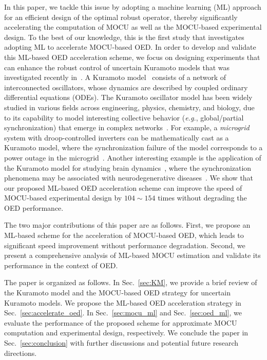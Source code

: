 \documentclass{article}
\begin{document}
In this paper, we tackle this issue by adopting a machine learning (ML) approach for an efficient design of the optimal robust operator, thereby significantly accelerating the computation of MOCU as well as the MOCU-based experimental design. To the best of our knowledge, this is the first study that investigates adopting ML to accelerate MOCU-based OED. In order to develop and validate this ML-based OED acceleration scheme, we focus on designing experiments that can enhance the robust control of uncertain Kuramoto models that was investigated recently in~\cite{Hong2021}. A Kuramoto model~\cite{kuramoto1975self} consists of a network of interconnected oscillators, whose dynamics are described by coupled ordinary differential equations (ODEs). The Kuramoto oscillator model has been widely studied in various fields across engineering, physics, chemistry, and biology, due to its capability to model interesting collective behavior (\textit{e.g.}, global/partial synchronization) that emerge in complex networks~\cite{Wiesenfeld_1998,N_da_2000,hammond2007pathological,Kitzbichler2009,Breakspear_2010,Bhowmik_2012,simpson2012droop,Fernandez_2015,Skardal2015,Mohseni2017,Choi2019,guo2021overviews}. For example, a \textit{microgrid} system with droop-controlled inverters can be mathematically cast as a Kuramoto model, where the synchronization failure of the model corresponds to a power outage in the microgrid~\cite{simpson2012droop,Skardal2015,guo2021overviews,PRL12,PG13,Auto13,PNAS13}. Another interesting example is the application of the Kuramoto model for studying brain dynamics~\cite{hammond2007pathological,Kitzbichler2009,Mohseni2017,Choi2019}, where the synchronization phenomena may be associated with neurodegenerative diseases~\cite{Mohseni2017,lehnertz2009synchronization}. We show that our proposed ML-based OED acceleration scheme can improve the speed of MOCU-based experimental design by ${104\sim154}$ times without degrading the OED performance. 

The two major contributions of this paper are as follows. First, we propose an ML-based scheme for the acceleration of MOCU-based OED, which leads to significant speed improvement without performance degradation. Second, we present a comprehensive analysis of ML-based MOCU estimation and validate its performance in the context of OED.

The paper is organized as follows. In Sec.~\ref{sec:KM}, we provide a brief review of the Kuramoto model and the MOCU-based OED strategy for uncertain Kuramoto models. We propose the ML-based OED acceleration strategy in Sec.~\ref{sec:accelerate_oed}. In Sec.~\ref{sec:mocu_ml} and Sec.~\ref{sec:oed_ml}, we evaluate the performance of the proposed scheme for approximate MOCU computation and experimental design, respectively. We conclude the paper in Sec.~\ref{sec:conclusion} with further discussions and potential future research directions.
\end{document}
